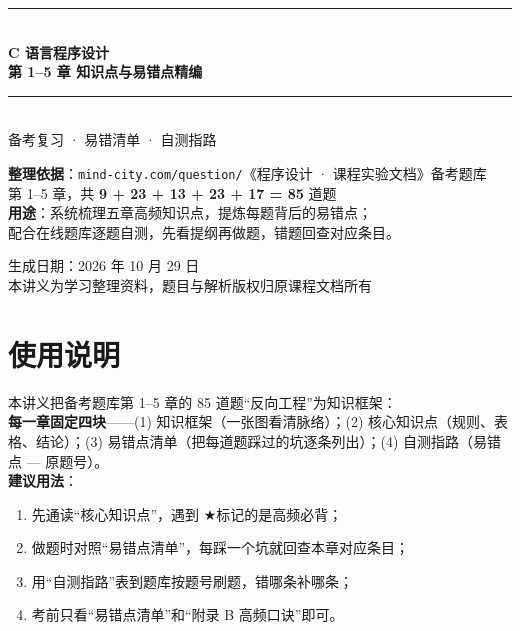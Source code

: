 \documentclass[UTF8,zihao=-4,a4paper]{ctexart}
\newcommand{\cstar}{\textcolor{deepred}{$\bigstar$}}
\begin{document}
\begin{titlepage}
\centering
\vspace*{2.2cm}
{\color{mainblue}\rule{\linewidth}{1.2pt}}\\[0.5cm]
{\Huge\bfseries\color{mainblue} C 语言程序设计}\\[0.35cm]
{\Huge\bfseries\color{mainblue} 第 1–5 章 知识点与易错点精编}\\[0.5cm]
{\color{mainblue}\rule{\linewidth}{1.2pt}}\\[1.2cm]

{\Large 备考复习 · 易错清单 · 自测指路}\\[2.0cm]

\begin{tcolorbox}[colback=softgray,colframe=gray!55,width=0.86\linewidth,arc=3pt]
\centering\small
\textbf{整理依据}：\texttt{mind-city.com/question/}《程序设计 · 课程实验文档》备考题库\\
第 1–5 章，共 \textbf{9 + 23 + 13 + 23 + 17 = 85} 道题\\
\textbf{用途}：系统梳理五章高频知识点，提炼每题背后的易错点；\\
配合在线题库逐题自测，先看提纲再做题，错题回查对应条目。
\end{tcolorbox}

\vfill
{\small 生成日期：2026 年 10 月 29 日}\\[0.3cm]
{\small 本讲义为学习整理资料，题目与解析版权归原课程文档所有}
\end{titlepage}

\tableofcontents
\newpage

\section*{使用说明}

本讲义把备考题库第 1–5 章的 85 道题“反向工程”为知识框架：\\
\textbf{每一章固定四块}——(1) 知识框架（一张图看清脉络）；(2) 核心知识点（规则、表格、结论）；(3) 易错点清单（把每道题踩过的坑逐条列出）；(4) 自测指路（易错点 — 原题号）。\\

\textbf{建议用法}：
\begin{enumerate}
  \item 先通读“核心知识点”，遇到 \cstar 标记的是高频必背；
  \item 做题时对照“易错点清单”，每踩一个坑就回查本章对应条目；
  \item 用“自测指路”表到题库按题号刷题，错哪条补哪条；
  \item 考前只看“易错点清单”和“附录 B 高频口诀”即可。
\end{enumerate}
\end{document}
